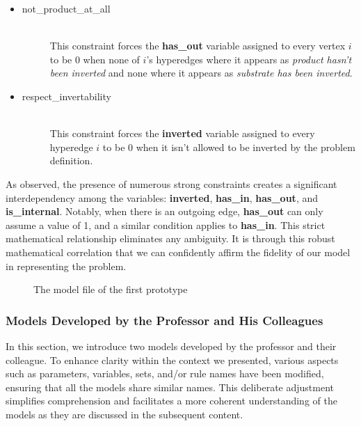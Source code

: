 \begin{enumerate}
\begin{itemize}
        \item 
        \begin{description}
            \item[not\_product\_at\_all] ~\\
            This constraint forces the \textbf{has\_out} variable assigned to every vertex $i$ to be 0 when none of $i$'s hyperedges where it appears as \emph{product hasn't been inverted} and none where it appears as \emph{substrate has been inverted}.
        \end{description}
        \item 
        \begin{description}
            \item[respect\_invertability] ~\\
            This constraint forces the \textbf{inverted} variable assigned to every hyperedge $i$ to be 0 when it isn't allowed to be inverted by the problem definition.
        \end{description}
    \end{itemize}
\end{enumerate} 

As observed, the presence of numerous strong constraints creates a significant interdependency among the variables: \textbf{inverted}, \textbf{has\_in}, \textbf{has\_out}, and \textbf{is\_internal}. Notably, when there is an outgoing edge, \textbf{has\_out} can only assume a value of 1, and a similar condition applies to \textbf{has\_in}. This strict mathematical relationship eliminates any ambiguity. It is through this robust mathematical correlation that we can confidently affirm the fidelity of our model in representing the problem.
    
    
\begin{figure}[H]
    \centering
    \caption{The model file of the first prototype}
    \label{fig:first-Prototype}
\end{figure}



\subsubsection{Models Developed by the Professor and His Colleagues} \label{sec:model_a_b}
In this section, we introduce two models developed by the professor and their colleague. To enhance clarity within the context we presented, various aspects such as parameters, variables, sets, and/or rule names have been modified, ensuring that all the models share similar names. This deliberate adjustment simplifies comprehension and facilitates a more coherent understanding of the models as they are discussed in the subsequent content.

